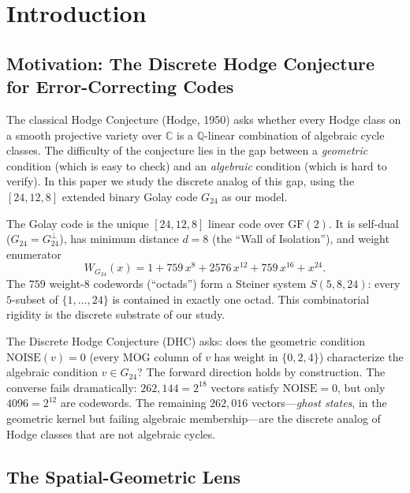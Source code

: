 \documentclass[11pt,a4paper]{article}
\begin{document}
\section{Introduction}

\subsection{Motivation: The Discrete Hodge Conjecture for Error-Correcting Codes}

The classical Hodge Conjecture (Hodge, 1950) asks whether every Hodge
class on a smooth projective variety over $\mathbb{C}$ is a
$\mathbb{Q}$-linear combination of algebraic cycle classes. The
difficulty of the conjecture lies in the gap between a \emph{geometric}
condition (which is easy to check) and an \emph{algebraic} condition
(which is hard to verify). In this paper we study the discrete analog of
this gap, using the $[24,12,8]$ extended binary Golay code $G_{24}$ as
our model.

The Golay code is the unique $[24,12,8]$ linear code over $\mathrm{GF}(2)$.
It is self-dual ($G_{24} = G_{24}^\perp$), has minimum distance $d = 8$
(the ``Wall of Isolation''), and weight enumerator
\begin{equation}
W_{G_{24}}(x) = 1 + 759\,x^8 + 2576\,x^{12} + 759\,x^{16} + x^{24}.
\label{eq:weight-enumerator}
\end{equation}
The $759$ weight-$8$ codewords (``octads'') form a Steiner system
$S(5,8,24)$: every $5$-subset of $\{1,\dots,24\}$ is contained in exactly
one octad. This combinatorial rigidity is the discrete substrate of our
study.

The Discrete Hodge Conjecture (DHC) asks: does the geometric condition
$\mathrm{NOISE}(v) = 0$ (every MOG column of $v$ has weight in
$\{0,2,4\}$) characterize the algebraic condition $v \in G_{24}$? The
forward direction holds by construction. The converse fails
dramatically: $262{,}144 = 2^{18}$ vectors satisfy $\mathrm{NOISE} = 0$,
but only $4096 = 2^{12}$ are codewords. The remaining $262{,}016$
vectors—\emph{ghost states}, in the geometric kernel but failing
algebraic membership—are the discrete analog of Hodge classes that are
not algebraic cycles.

\subsection{The Spatial-Geometric Lens}
\end{document}
